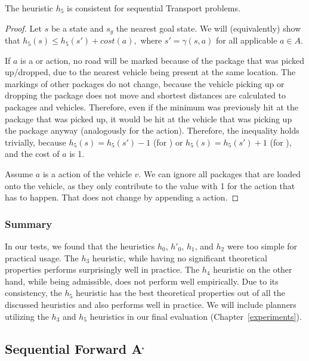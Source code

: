 \begin{thm}
The heuristic $h_5$ is consistent for sequential Transport problems.
\end{thm}
\begin{proof}
Let $s$ be a state and $s_g$ the nearest goal state.
We will (equivalently) show that $h_5(s) \leq h_5(s') + cost(a),$ where
$s' = \gamma(s, a)$ for all applicable $a \in A$.

If $a$ is a \pickup{} or \drop{} action,
no road will be marked because of the package that was picked up/dropped,
due to the nearest vehicle being present at the same location.
The markings of other packages do not change, because
the vehicle picking up or dropping the package does not move
and shortest distances are calculated to packages and vehicles.
Therefore, even if the minimum was previously hit at the package that was
picked up, it would be hit at the vehicle that was picking up
the package anyway (analogously for the \drop{} action).
Therefore, the inequality holds trivially, because $h_5(s) = h_5(s') - 1$ (for \drop{})
or $h_5(s) = h_5(s') + 1$ (for \pickup{}), and the cost of $a$ is 1.

Assume $a$ is a \drive{} action of the vehicle $v$.
We can ignore all packages that are loaded onto the vehicle,
as they only contribute to the value with 1 for the \drop{} action
that has to happen. That does not change by appending a \drive{} action.
\end{proof}


\subsubsection{Summary}

In our tests, we found that
the heuristics $h_0$, $h'_0$, $h_1$, and $h_2$
were too simple for practical usage.
The $h_3$ heuristic, while having no significant
theoretical properties performs surprisingly well in practice.
The $h_4$ heuristic on the other hand, while being admissible, does not
perform well empirically.
Due to its consistency, the $h_5$ heuristic has the best theoretical properties out of all the discussed heuristics and also
performs well in practice.
We will include planners utilizing the $h_3$ and $h_5$ heuristics
in our final evaluation (Chapter~\ref{experiments}).








\subsection{Sequential Forward A$^{\kern-.15em*}$}\label{sfa}

